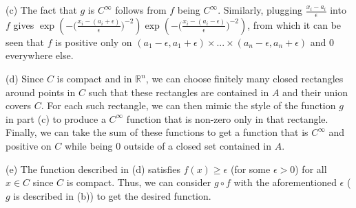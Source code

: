 (c) The fact that $g$ is $C^\infty$ follows from $f$ being $C^\infty$. Similarly,
plugging $\frac{x_i - a_i}{\epsilon}$ into $f$ gives
$\exp(-\big(\frac{x_i - (a_i + \epsilon)}{\epsilon}\big)^{-2}) \exp(-\big(\frac{x_i - (a_i - \epsilon)}{\epsilon}\big)^{-2})$, from
which it can be seen that $f$ is positive only on 
$(a_1 - \epsilon, a_1 + \epsilon) \times ... \times (a_n - \epsilon, a_n + \epsilon)$
and 0 everywhere else.

(d) Since $C$ is compact and in $\mathbb{R}^n$, we can choose finitely many
closed rectangles around points in $C$ such that these rectangles are contained
in $A$ and their union covers $C$. For each such rectangle, we can then mimic
the style of the function $g$ in part (c) to produce a $C^\infty$ function that is 
non-zero only in that rectangle. Finally, we can take the sum of these functions
to get a function that is $C^\infty$ and positive on $C$ while being 0 outside of a
closed set contained in $A$.

(e) The function described in (d) satisfies $f(x) \geq \epsilon$ (for some $\epsilon > 0$)
for all $x \in C$ since $C$ is compact. Thus, we can consider $g \circ f$ with
the aforementioned $\epsilon$ ($g$ is described in (b)) to get the desired 
function.
